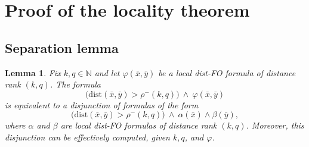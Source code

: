 \documentclass[11pt]{article}
\renewenvironment{leftbar}[1][blue]
{%
\def\FrameCommand
{%
{\hspace{-8pt} \color{#1} \vrule width 3pt}%
\hspace{0pt}%
\fboxsep=\FrameSep\colorbox{#1!5!}%
}%
\MakeFramed{\hsize\hsize\advance\hsize-\width\FrameRestore}%
}
{\endMakeFramed}
\newenvironment{szin}{\begin{leftbar}[red]{\noindent\bf sz: }}{\end{leftbar}}
\newtheorem{lemma}[theorem]{Lemma}
\theoremstyle{remark}
\def\phi{\varphi}
\def\N{\mathbb N}
\newcommand{\dist}{\mathrm{dist}}
\newcommand{\distFO}{\textrm{\upshape dist-FO}\xspace}
\newcommand{\tup}{\bar}
\begin{document}

\section{Proof of the locality theorem}\label{sec:proof}

\subsection{Separation lemma}

\begin{lemma}\label{lem:far-ltp}
    Fix $k,q\in\N$ and let $\phi(\tup x,\tup y)$ be a local \distFO formula of distance rank $(k,q)$.
    The formula
    $$\Big(\dist(\tup x,\tup y)>\rho^-(k,q)\Big) \ \land\ \phi(\tup x,\tup y)$$
    is equivalent to a disjunction of formulas of the form
    $$\Big(\dist(\tup x,\tup y)>\rho^-(k,q)\Big) \ \land\  \alpha(\tup x)\land \beta(\tup y),$$
    where $\alpha$ and $\beta$ are local \distFO formulas of distance rank $(k,q)$.
    Moreover, this disjunction can be effectively computed, given $k,q$, and $\phi$.
\end{lemma}
\end{document}
